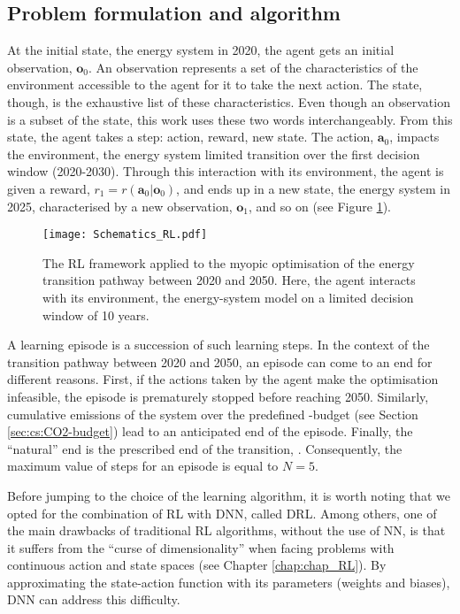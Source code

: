\subsection{Problem formulation and algorithm}
\label{subsec:meth_RL_algo}
At the initial state, \ie the energy system in 2020, the agent gets an initial observation, $\bm{o}_0$. An observation represents a set of the characteristics of the environment accessible to the agent for it to take the next action. The state, though, is the exhaustive list of these characteristics. Even though an observation is a subset of the state, this work uses these two words interchangeably. From this state, the agent takes a step: action, reward, new state. The action, $\bm{a}_0$, impacts the environment, \ie the energy system limited transition over the first decision window (2020-2030). Through this interaction with its environment, the agent is given a reward, $r_1=r\left(\bm{a}_0 | \bm{o}_0 \right)$, and ends up in a new state, \ie the energy system in 2025, characterised by a new observation, $\bm{o}_1$, and so on (see Figure \ref{fig:Schematics_RL}).


\begin{figure}[!htbp]
\centering
\texttt{[image: Schematics\_RL.pdf]}
\caption{The \Acrfull{RL} framework applied to the myopic optimisation of the energy transition pathway between 2020 and 2050. Here, the agent interacts with its environment, \ie the energy-system model on a limited decision window of 10 years.}
\label{fig:Schematics_RL}
\end{figure}

A learning episode is a succession of such learning steps. In the context of the transition pathway between 2020 and 2050, an episode can come to an end for different reasons. First, if the actions taken by the agent make the optimisation infeasible, the episode is prematurely stopped before reaching 2050. Similarly, cumulative emissions of the system over the predefined -budget (see Section \ref{sec:cs:CO2-budget}) lead to an anticipated end of the episode. Finally, the ``natural'' end is the prescribed end of the transition, . Consequently, the maximum value of steps for an episode is equal to $N=5$. 

\newpage
Before jumping to the choice of the learning algorithm, it is worth noting that we opted for the combination of \gls{RL} with \gls{DNN}, called \gls{DRL}. Among others, one of the main drawbacks of traditional \gls{RL} algorithms, \ie without the use of \gls{NN},  is that it suffers from the ``curse of dimensionality'' when facing problems with continuous action and state spaces (see Chapter \ref{chap:chap_RL}). By approximating the state-action function with its parameters (\ie weights and biases), \gls{DNN} can address this difficulty. 

